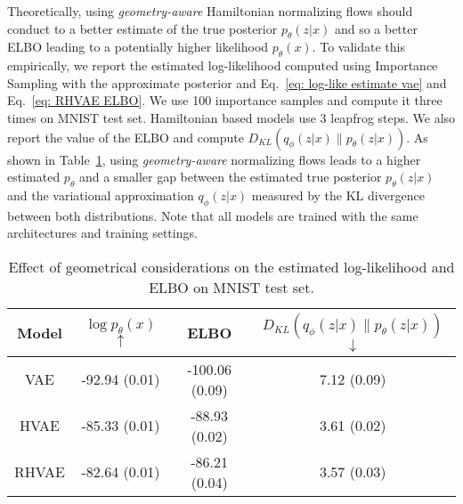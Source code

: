 \documentclass[10pt,journal,compsoc]{IEEEtran}
\begin{document}
    Theoretically, using \emph{geometry-aware} Hamiltonian normalizing flows should conduct to a better estimate of the true posterior $p_{\theta}(z|x)$ and so a better ELBO leading to a potentially higher likelihood $p_{\theta}(x)$. To validate this empirically, we report the estimated log-likelihood computed using Importance Sampling with the approximate posterior and Eq.~\eqref{eq: log-like estimate vae} and Eq.~\eqref{eq: RHVAE ELBO}. We use 100 importance samples and compute it three times on MNIST test set. Hamiltonian based models use 3 leapfrog steps. We also report the value of the ELBO and compute $D_{KL}(q_{\phi}(z|x) \lVert p_{\theta}(z|x))$. As shown in Table~\ref{table:NLL comparison}, using \emph{geometry-aware} normalizing flows leads to a higher estimated $p_{\theta}$ and a smaller gap between the estimated true posterior $ p_{\theta}(z|x)$ and the variational approximation $q_{\phi}(z|x)$ measured by the KL divergence between both distributions. Note that all models are trained with the same architectures and training settings.
    
    \begin{table}[ht]
    \caption{Effect of geometrical considerations on the estimated log-likelihood and ELBO on MNIST test set.}
    \label{table:NLL comparison}
    \begin{center}
    \scriptsize
    \begin{tabular}{c | c | c | c }
    \hline
    Model & $\log p_{\theta}(x)$ $\uparrow$ & ELBO & $D_{KL}(q_{\phi}(z|x) \lVert p_{\theta}(z|x))$ $\downarrow$ \\
    \hline
    VAE   & -92.94 (0.01) & -100.06 (0.09)& 7.12 (0.09) \\
    HVAE  & -85.33 (0.01) & -88.93 (0.02) & 3.61 (0.02) \\
    RHVAE & -82.64 (0.01) & -86.21 (0.04) & 3.57 (0.03)\\
    \hline
    \end{tabular}
    \end{center}
    \end{table}

    
\end{document}
